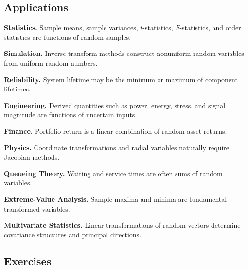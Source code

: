 \subsection{Applications}
\label{subsec:functions-random-variables-applications}

\begin{applicationbox}

\textbf{Statistics.}
Sample means, sample variances, \(t\)-statistics, \(F\)-statistics, and
order statistics are functions of random samples.

\medskip

\textbf{Simulation.}
Inverse-transform methods construct nonuniform random variables from
uniform random numbers.

\medskip

\textbf{Reliability.}
System lifetime may be the minimum or maximum of component lifetimes.

\medskip

\textbf{Engineering.}
Derived quantities such as power, energy, stress, and signal magnitude
are functions of uncertain inputs.

\medskip

\textbf{Finance.}
Portfolio return is a linear combination of random asset returns.

\medskip

\textbf{Physics.}
Coordinate transformations and radial variables naturally require
Jacobian methods.

\medskip

\textbf{Queueing Theory.}
Waiting and service times are often sums of random variables.

\medskip

\textbf{Extreme-Value Analysis.}
Sample maxima and minima are fundamental transformed variables.

\medskip

\textbf{Multivariate Statistics.}
Linear transformations of random vectors determine covariance
structures and principal directions.

\end{applicationbox}

\subsection{Exercises}
\label{subsec:functions-random-variables-exercises}

